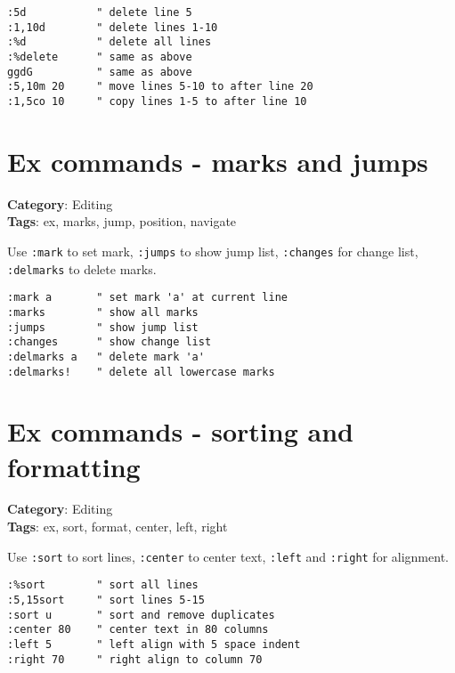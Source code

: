 {{{{{\begin{Exa*}{}
\begin{Verbatim}[fontsize=\footnotesize, breaklines, breakanywhere]
:5d           " delete line 5
:1,10d        " delete lines 1-10
:%d           " delete all lines
:%delete      " same as above
ggdG          " same as above
:5,10m 20     " move lines 5-10 to after line 20
:1,5co 10     " copy lines 1-5 to after line 10
\end{Verbatim}
\end{Exa*}

\section{Ex commands - marks and jumps}

\textbf{Category}: Editing\\ \textbf{Tags}: ex, marks, jump, position, navigate
\vspace{0.5cm}

Use {\footnotesize \Verb§:mark§} to set mark, {\footnotesize \Verb§:jumps§} to show jump list, {\footnotesize \Verb§:changes§} for change list, {\footnotesize \Verb§:delmarks§} to delete marks.

\begin{Exa*}{}
\begin{Verbatim}[fontsize=\footnotesize, breaklines, breakanywhere]
:mark a       " set mark 'a' at current line
:marks        " show all marks
:jumps        " show jump list
:changes      " show change list
:delmarks a   " delete mark 'a'
:delmarks!    " delete all lowercase marks
\end{Verbatim}
\end{Exa*}

\section{Ex commands - sorting and formatting}

\textbf{Category}: Editing\\ \textbf{Tags}: ex, sort, format, center, left, right
\vspace{0.5cm}

Use {\footnotesize \Verb§:sort§} to sort lines, {\footnotesize \Verb§:center§} to center text, {\footnotesize \Verb§:left§} and {\footnotesize \Verb§:right§} for alignment.

\begin{Exa*}{}
\begin{Verbatim}[fontsize=\footnotesize, breaklines, breakanywhere]
:%sort        " sort all lines
:5,15sort     " sort lines 5-15
:sort u       " sort and remove duplicates
:center 80    " center text in 80 columns
:left 5       " left align with 5 space indent
:right 70     " right align to column 70
\end{Verbatim}
\end{Exa*}

}}}}}
